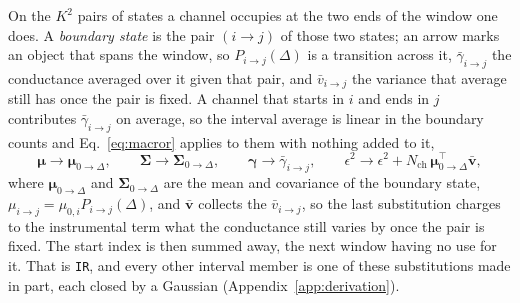 On the $K^2$ pairs of states a channel occupies at the two ends of the window one does. A
\emph{boundary state} is the pair $(i\to j)$ of those two states; an arrow marks an object that
spans the window, so $P_{i\to j}(\Delta)$ is a transition across it, $\bar{\gamma}_{i\to j}$ the
conductance averaged over it given that pair, and $\bar{v}_{i\to j}$ the variance that average
still has once the pair is fixed. A channel that starts in $i$ and ends in $j$ contributes
$\bar{\gamma}_{i\to j}$ on average, so the interval average is linear in the boundary counts and
Eq.~\ref{eq:macror} applies to them with nothing added to it,
\begin{equation}
  \bm{\mu} \to \bm{\mu}_{0\to\Delta},
  \qquad
  \bm{\Sigma} \to \bm{\Sigma}_{0\to\Delta},
  \qquad
  \bm{\gamma} \to \bar{\gamma}_{i\to j},
  \qquad
  \epsilon^2 \to \epsilon^2 + N_{\mathrm{ch}}\,\bm{\mu}_{0\to\Delta}^\top\bar{\bm{v}},
  \label{eq:macroir}
\end{equation}
where $\bm{\mu}_{0\to\Delta}$ and $\bm{\Sigma}_{0\to\Delta}$ are the mean and covariance of the
boundary state, $\mu_{i\to j}=\mu_{0,i}P_{i\to j}(\Delta)$, and $\bar{\bm{v}}$ collects the
$\bar{v}_{i\to j}$, so the last substitution charges to the instrumental term what the
conductance still varies by once the pair is fixed. The start index
is then summed away, the next window having no use for it. That is \texttt{IR}, and every other
interval member is one of these substitutions made in part, each closed by a Gaussian
(Appendix~\ref{app:derivation}).

